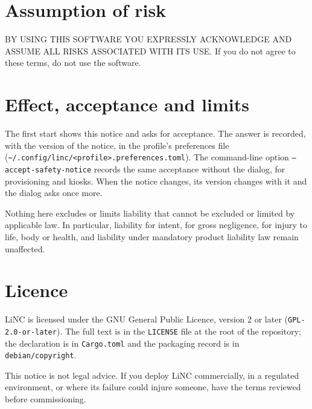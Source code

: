 \section*{Assumption of risk}

BY USING THIS SOFTWARE YOU EXPRESSLY ACKNOWLEDGE AND ASSUME ALL RISKS ASSOCIATED WITH ITS
USE. If you do not agree to these terms, do not use the software.

\section*{Effect, acceptance and limits}

The first start shows this notice and asks for acceptance. The answer is recorded, with
the version of the notice, in the profile's preferences file
(\texttt{\textasciitilde/.config/linc/<profile>.preferences.toml}). The command-line option
\texttt{--accept-safety-notice} records the same acceptance without the dialog, for
provisioning and kiosks. When the notice changes, its version changes with it and the
dialog asks once more.

Nothing here excludes or limits liability that cannot be excluded or limited by applicable
law. In particular, liability for intent, for gross negligence, for injury to life, body or
health, and liability under mandatory product liability law remain unaffected.

\section*{Licence}

LiNC is licensed under the GNU General Public Licence, version 2 or later
(\texttt{GPL-2.0-or-later}). The full text is in the \texttt{LICENSE} file at the root of
the repository; the declaration is in \texttt{Cargo.toml} and the packaging record is in
\texttt{debian/copyright}.

\begin{notebox}
  This notice is not legal advice. If you deploy LiNC commercially, in a regulated
  environment, or where its failure could injure someone, have the terms reviewed before
  commissioning.
\end{notebox}

